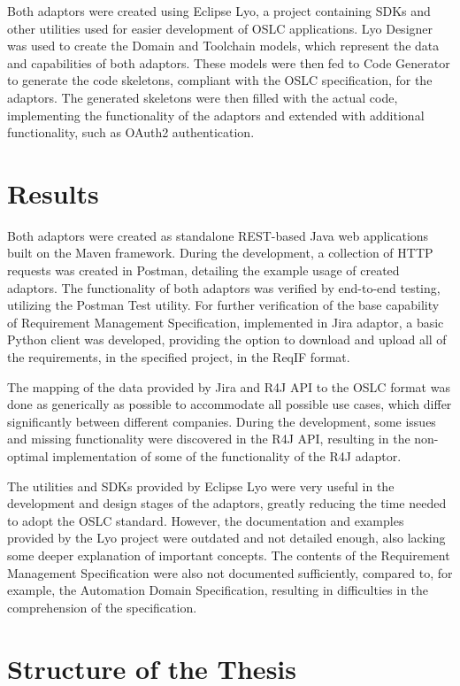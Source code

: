 Both adaptors were created using Eclipse Lyo, a project containing SDKs and other utilities used for easier development of OSLC applications. Lyo Designer was used to create the Domain and Toolchain models, which represent the data and capabilities of both adaptors. These models were then fed to Code Generator to generate the code skeletons, compliant with the OSLC specification, for the adaptors. The generated skeletons were then filled with the actual code, implementing the functionality of the adaptors and extended with additional functionality, such as OAuth2 authentication.

\section{Results}
Both adaptors were created as standalone REST-based Java web applications built on the Maven framework. During the development, a collection of HTTP requests was created in Postman, detailing the example usage of created adaptors. The functionality of both adaptors was verified by end-to-end testing, utilizing the Postman Test utility. For further verification of the base capability of Requirement Management Specification, implemented in Jira adaptor, a basic Python client was developed, providing the option to download and upload all of the requirements, in the specified project, in the ReqIF format.

The mapping of the data provided by Jira and R4J API to the OSLC format was done as generically as possible to accommodate all possible use cases, which differ significantly between different companies. During the development, some issues and missing functionality were discovered in the R4J API, resulting in the non-optimal implementation of some of the functionality of the R4J adaptor.

The utilities and SDKs provided by Eclipse Lyo were very useful in the development and design stages of the adaptors, greatly reducing the time needed to adopt the OSLC standard. However, the documentation and examples provided by the Lyo project were outdated and not detailed enough, also lacking some deeper explanation of important concepts. The contents of the Requirement Management Specification were also not documented sufficiently, compared to, for example, the Automation Domain Specification, resulting in difficulties in the comprehension of the specification.

\section{Structure of the Thesis}

